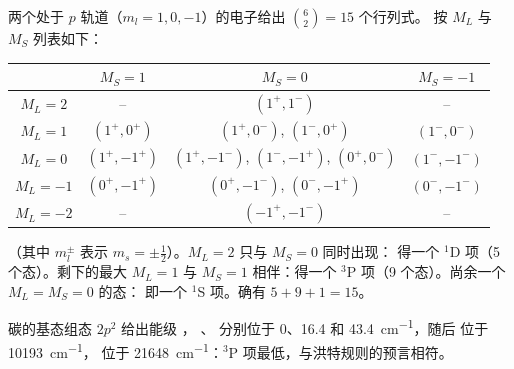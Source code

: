 \begin{example}[$p^2$ 的谱项]\label{ex:b3:many-electron-atoms:p2}
两个处于 $p$ 轨道（$m_l = 1, 0, -1$）的电子给出 $\binom62 = 15$ 个行列式。
按 $M_L$ 与 $M_S$ 列表如下：
\begin{center}\small
\begin{tabular}{c|ccc}
\hline
 & $M_S = 1$ & $M_S = 0$ & $M_S = -1$\\ \hline
$M_L = 2$ & -- & $(1^+,1^-)$ & --\\
$M_L = 1$ & $(1^+,0^+)$ & $(1^+,0^-)$, $(1^-,0^+)$ & $(1^-,0^-)$\\
$M_L = 0$ & $(1^+,-1^+)$ & $(1^+,-1^-)$, $(1^-,-1^+)$, $(0^+,0^-)$ & $(1^-,-1^-)$\\
$M_L = -1$ & $(0^+,-1^+)$ & $(0^+,-1^-)$, $(0^-,-1^+)$ & $(0^-,-1^-)$\\
$M_L = -2$ & -- & $(-1^+,-1^-)$ & --\\ \hline
\end{tabular}
\end{center}
（其中 $m_l^\pm$ 表示 $m_s = \pm\frac12$）。$M_L = 2$ 只与 $M_S = 0$ 同时出现：
得一个 ${}^1$D 项（5 个态）。剩下的最大 $M_L = 1$ 与
$M_S = 1$ 相伴：得一个 ${}^3$P 项（9 个态）。尚余一个 $M_L = M_S = 0$ 的态：
即一个 ${}^1$S 项。确有 $5 + 9 + 1 = 15$。
\end{example}

\begin{example}[碳，实测]\label{ex:b3:many-electron-atoms:carbon}
碳的基态组态 $2p^2$ 给出能级 ，
、 分别位于 0、16.4 和 \qty{43.4}{cm^{-1}}，随后
 位于 \qty{10193}{cm^{-1}}， 位于
\qty{21648}{cm^{-1}}：${}^3$P 项最低，与洪特规则的预言相符。
\end{example}


